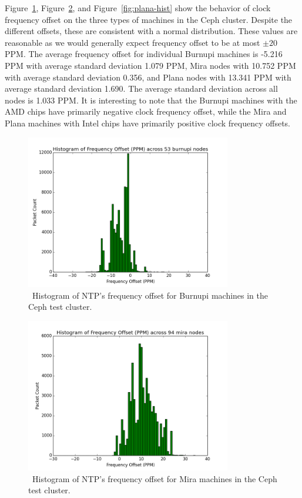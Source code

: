 Figure~\ref{fig:burnupi-hist}, Figure~\ref{fig:mira-hist},
and Figure~\ref{fig:plana-hist} show the behavior of clock frequency offset
on the three types of machines in the Ceph cluster. Despite the different offsets, 
these are consistent with a normal distribution. These values are reasonable 
as we would generally expect frequency offset to be at most $\pm 20$ PPM. 
The average frequency offset for individual Burnupi machines is -5.216 PPM with 
average standard deviation 1.079 PPM, Mira nodes with 10.752 PPM with average
standard deviation 0.356, and Plana nodes with 13.341 PPM with average standard deviation 1.690. The average standard deviation across all nodes is
1.033 PPM. It is interesting to note that the Burnupi machines with 
the AMD chips have primarily negative clock frequency offset, while the 
Mira and Plana machines with Intel chips have primarily positive 
clock frequency offsets.

\begin{figure}[h]
  \centering
  \caption{~Histogram of NTP's frequency offset for Burnupi machines in the Ceph test cluster.}
  \label{fig:burnupi-hist}
  \includegraphics[width=0.8\textwidth]{burnupi-freq-offset.png}
\end{figure}

\begin{figure}[h]
  \centering
  \caption{~Histogram of NTP's frequency offset for Mira machines in the Ceph test cluster.}
  \label{fig:mira-hist}
  \includegraphics[width=0.8\textwidth]{mira-freq-offset.png}
\end{figure}

